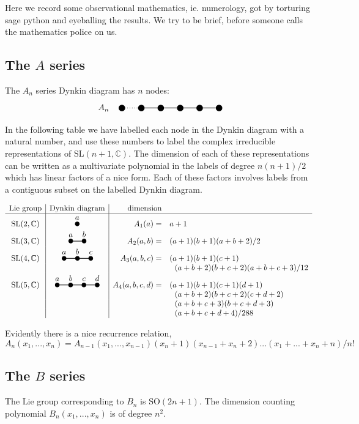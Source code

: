 \documentclass[11pt,oneside]{article}
\newcommand{\Complex}{\mathbb{C}}
\newcommand{\SL}{\mathrm{SL}}
\newcommand{\SO}{\mathrm{SO}}
\begin{document}
Here we record some observational mathematics, ie. numerology,
got by torturing sage python and eyeballing the results.
We try to be brief, before someone calls the mathematics police on us.

\subsection{The $A$ series}


The $A_n$ series Dynkin diagram has $n$ nodes:
$$ \DynkinAn $$
In the following table we have labelled
each node in the Dynkin diagram with a natural number,
and use these numbers to label the complex irreducible
representations of $\SL(n+1,\Complex)$.
The dimension of each of these representations
can be written as a multivariate polynomial in the labels of degree 
$n(n+1)/2$ which has linear factors of a nice form.
Each of these factors involves labels from a contiguous subset on
the labelled Dynkin diagram.

$$
\begin{array}{c|c|rl}
\text{Lie group} & \text{Dynkin diagram} & \text{dimension} & \\
\hline
\SL(2,\Complex)           & \DynkinAa   & A_1(a) =& a+1 \\
\SL(3,\Complex)           & \DynkinAab  & A_2(a,b) =& (a+1)(b+1)(a+b+2)/2 \\
\SL(4,\Complex)           & \DynkinAabc   & A_3(a,b,c) =& (a+1)(b+1)(c+1) \\
 & & &\ \ (a+b+2)(b+c+2)(a+b+c+3)/12 \\
\SL(5,\Complex)           & \DynkinAabcd  & A_4(a,b,c,d) =& (a+1)(b+1)(c+1)(d+1) \\
 & & &\ \ (a+b+2)(b+c+2)(c+d+2) \\
 & & &\ \ (a+b+c+3)(b+c+d+3) \\
    & & & \ \ (a+b+c+d+4)/288 \\
\end{array}
$$

Evidently there is a nice recurrence relation,
$$
    A_n(x_1,...,x_n) = A_{n-1}(x_1,...,x_{n-1})
    (x_n + 1)
    (x_{n-1} + x_n + 2)
    ...
    (x_1 + ... + x_n + n) 
    / n!
$$

\subsection{The $B$ series}

The Lie group corresponding to $B_n$ is $\SO(2n+1).$
The dimension counting polynomial $B_n(x_1,...,x_n)$ is
of degree $n^2.$
\end{document}
